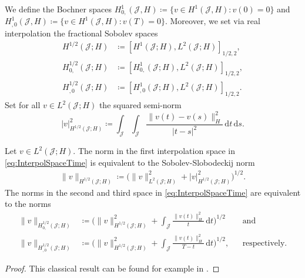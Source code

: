 \documentclass{amsart}
\providecommand{\dt}{\,\mathrm{d}t}
\providecommand{\ds}{\,\mathrm{d}s}
\newcommand{\cJ}{\mathcal J}
\begin{document}
We define the Bochner spaces $H^1_{0,}(\cJ,H) \coloneqq \lbrace v \in H^1(\cJ,H) \colon v(0) = 0\rbrace$ and $H^1_{,0}(\cJ,H) \coloneqq \lbrace v \in H^1(\cJ,H) \colon v(T) = 0\rbrace$. Moreover, we set via real interpolation \cite{LionsPeetre64} the fractional Sobolev spaces
\begin{equation}\label{eq:InterpolSpaceTime}
\begin{aligned}
H^{1/2}(\mathcal{J};H) & \coloneqq [H^1(\mathcal{J};H),L^2(\mathcal{J};H)]_{1/2,2},\\
H^{1/2}_{0,}(\mathcal{J};H) & \coloneqq [H_{0,}^1(\mathcal{J};H),L^2(\mathcal{J};H)]_{1/2,2},\\
H^{1/2}_{,0}(\mathcal{J};H) & \coloneqq [H^1_{,0}(\mathcal{J};H),L^2(\mathcal{J};H)]_{1/2,2}.
\end{aligned}
\end{equation}
Set for all $v\in L^2(\cJ;H)$ the squared semi-norm 
\begin{equation*}
\lvert v \rvert_{H^{1/2}(\mathcal{J};H)}^2 \coloneqq \int_\mathcal{J} \int_\mathcal{J} \frac{\lVert v(t) - v(s)\rVert_H^2}{|t-s|^2} \dt\ds.
\end{equation*}
\begin{proposition}\label{prop:equiNorms}
Let $v\in L^2(\cJ;H)$.
The norm in the first interpolation space in \eqref{eq:InterpolSpaceTime} is equivalent to the Sobolev-Slobodeckij norm 
\begin{align*}
\lVert v \rVert_{H^{1/2}(\mathcal{J};H)} \coloneqq \big(\lVert v \rVert_{L^2(\mathcal{J};H)}^2 + \lvert v \rvert_{H^{1/2}(\mathcal{J};H)}^2\big)^{1/2}.
\end{align*}
The norms in the second and third space in \eqref{eq:InterpolSpaceTime} are equivalent to the norms 
\begin{align*}
\lVert v \rVert_{H_{0,}^{1/2}(\mathcal{J};H)} & \coloneqq \Big(\lVert v \rVert_{H^{1/2}(\mathcal{J};H)}^2  + \int_{\cJ} \frac{\lVert v(t) \rVert_H^2}{t} \dt \Big)^{1/2}&&\text{and}\\
\lVert v \rVert_{H_{,0}^{1/2}(\mathcal{J};H)} & \coloneqq \Big(\lVert v \rVert_{H^{1/2}(\mathcal{J};H)}^2  + \int_{\cJ} \frac{\lVert v(t) \rVert_H^2}{T-t} \dt \Big)^{1/2},&&\text{respectively}.
\end{align*}
\end{proposition}
\begin{proof}
This classical result can be found for example in \cite{LionsMagenes72}.
\end{proof}
%
\end{document}
